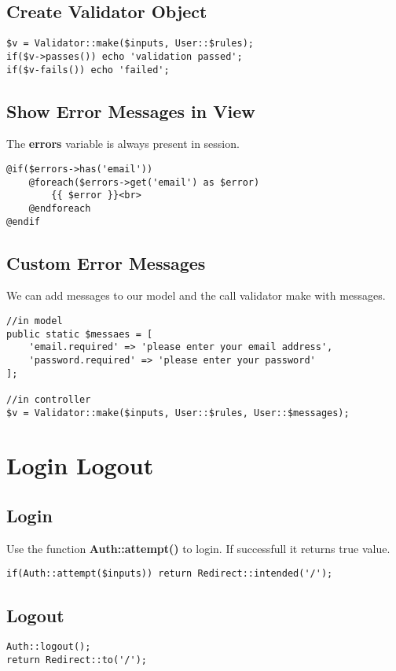 \documentclass[a4paper, 10pt]{article}
\begin{document}
\subsection{Create Validator Object}
\begin{verbatim}
$v = Validator::make($inputs, User::$rules);
if($v->passes()) echo 'validation passed';
if($v-fails()) echo 'failed';
\end{verbatim}
\subsection{Show Error Messages in View}
The \textbf{errors} variable is always present in session.
\begin{verbatim}
@if($errors->has('email'))
    @foreach($errors->get('email') as $error)
        {{ $error }}<br>
    @endforeach
@endif
\end{verbatim}
\subsection{Custom Error Messages}
We can add messages to our model and the call validator make with messages.
\begin{verbatim}
//in model
public static $messaes = [
    'email.required' => 'please enter your email address',
    'password.required' => 'please enter your password'
];

//in controller
$v = Validator::make($inputs, User::$rules, User::$messages);
\end{verbatim}

\section{Login Logout}
\subsection{Login}
Use the function \textbf{Auth::attempt()} to login.
If successfull it returns true value.
\begin{verbatim}
if(Auth::attempt($inputs)) return Redirect::intended('/');
\end{verbatim}
\subsection{Logout}
\begin{verbatim}
Auth::logout();
return Redirect::to('/');
\end{verbatim}
\end{document}
